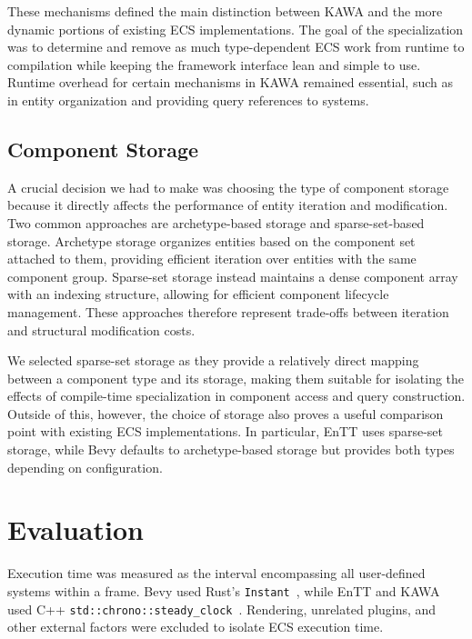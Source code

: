 \documentclass[conference]{IEEEtran}
\begin{document}
    These mechanisms defined the main distinction between KAWA and the more dynamic portions of existing ECS implementations.
    The goal of the specialization was to determine and remove as much type-dependent ECS work from runtime to compilation while keeping the framework interface lean and simple to use.
    Runtime overhead for certain mechanisms in KAWA remained essential, such as in entity organization and providing query references to systems.

    \subsection{Component Storage}\label{subsec:component-storage}

    A crucial decision we had to make was choosing the type of component storage because it directly affects the performance of entity iteration and modification.
    Two common approaches are archetype-based storage and sparse-set-based storage.
    Archetype storage organizes entities based on the component set attached to them, providing efficient iteration over entities with the same component group.
    Sparse-set storage instead maintains a dense component array with an indexing structure, allowing for efficient component lifecycle management.
    These approaches therefore represent trade-offs between iteration and structural modification costs. \cite{cox2025run}

    We selected sparse-set storage as they provide a relatively direct mapping between a component type and its storage,
    making them suitable for isolating the effects of compile-time specialization in component access and query construction.
    Outside of this, however, the choice of storage also proves a useful comparison point with existing ECS implementations.
    In particular, EnTT uses sparse-set storage, while Bevy defaults to archetype-based storage but provides both types depending on configuration.


    \section{Evaluation}
    \label{sec:method}

    Execution time was measured as the interval encompassing all user-defined systems within a frame.
    Bevy used Rust's \verb|Instant|~\cite{rust_instant}, while EnTT and KAWA used C++ \verb|std::chrono::steady_clock|~\cite{cpp_steady_clock}.
    Rendering, unrelated plugins, and other external factors were excluded to isolate ECS execution time.
\end{document}
